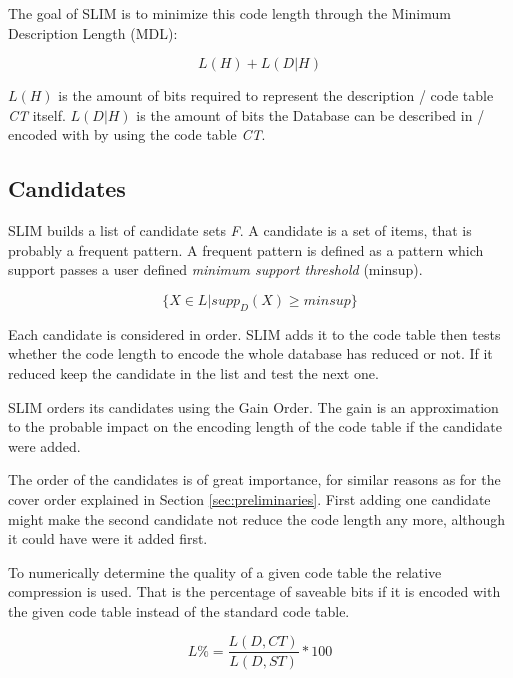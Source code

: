 \documentclass[runningheads]{llncs}
\begin{document}
The goal of SLIM is to minimize this code length through the Minimum Description Length (MDL):

\begin{equation}
\label{eq:mdl}
L(H) + L(D | H)
\end{equation}

$L(H)$ is the amount of bits required to represent the description / code table \emph{CT} itself. $L(D|H)$ is the amount of bits the Database can be described in / encoded with by using the code table \emph{CT}.

\subsection{Candidates}
\label{sec:candidates}
SLIM builds a list of candidate sets \emph{F}.
A candidate is a set of items, that is probably a frequent pattern. A frequent pattern is defined as a pattern which support passes a user defined \emph{minimum support threshold} (minsup).

\begin{equation}
\label{eq:minsup}
\{ X \in L | supp_D(X) \geq minsup \}
\end{equation}

Each candidate is considered in order. SLIM adds it to the code table then tests whether the code length to encode the whole database has reduced or not. If it reduced keep the candidate in the list and test the next one.

SLIM orders its candidates using the Gain Order. The gain is an approximation to the probable impact on the encoding length of the code table if the candidate were added. 

The order of the candidates is of great importance, for similar reasons as for the cover order explained in Section \ref{sec:preliminaries}.
First adding one candidate might make the second candidate not reduce the code length any more, although it could have were it added first.

To numerically determine the quality of a given code table the relative compression is used. That is the percentage of saveable bits if it is encoded with the given code table instead of the standard code table.

\begin{equation}
\label{eq:relative}
L\% = \frac{L(D, CT)}{L(D, ST)} * 100
\end{equation}
\end{document}
